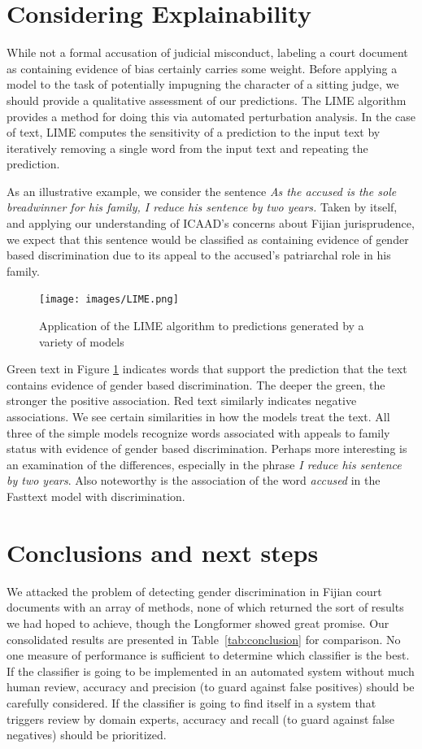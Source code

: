 \documentclass[twocolumn,10pt]{wmrDoc}
\begin{document}
\section{Considering Explainability}
While not a formal accusation of judicial misconduct, labeling a court document as containing evidence of bias certainly carries some weight.  Before applying a model to the task of potentially impugning the character of a sitting judge, we should provide a qualitative assessment of our predictions.  The LIME algorithm \cite{lime} provides a method for doing this via automated perturbation analysis.  In the case of text, LIME computes the sensitivity of a prediction to the input text by iteratively removing a single word from the input text and repeating the prediction.  

As an illustrative example, we consider the sentence \emph{As the accused is the sole breadwinner for his family, I reduce his sentence by two years.}  Taken by itself, and applying our understanding of ICAAD's concerns about Fijian jurisprudence, we expect that this sentence would be classified as containing evidence of gender based discrimination due to its appeal to the accused's patriarchal role in his family.

\begin{figure}[h]
    \centering
    \texttt{[image: images/LIME.png]}
    \caption{Application of the LIME algorithm to predictions generated by a variety of models}
    \label{fig:LIME}
\end{figure}

Green text in Figure \ref{fig:LIME} indicates words that support the prediction that the text contains evidence of gender based discrimination.  The deeper the green, the stronger the positive association.  Red text similarly indicates negative associations.  We see certain similarities in how the models treat the text.  All three of the simple models recognize words associated with appeals to family status with evidence of gender based discrimination.  Perhaps more interesting is an examination of the differences, especially in the phrase \emph{I reduce his sentence by two years}.  Also noteworthy is the association of the word \emph{accused} in the Fasttext model with discrimination.

\section{Conclusions and next steps}

We attacked the problem of detecting gender discrimination in Fijian court documents with an array of methods, none of which returned the sort of results we had hoped to achieve, though the Longformer showed great promise.  Our consolidated results are presented in Table~\ref{tab:conclusion} for comparison.  No one measure of performance is sufficient to determine which classifier is the best.  If the classifier is going to be implemented in an automated system without much human review, accuracy and precision (to guard against false positives) should be carefully considered.  If the classifier is going to find itself in a system that triggers review by domain experts, accuracy and recall (to guard against false negatives) should be prioritized.
\end{document}
